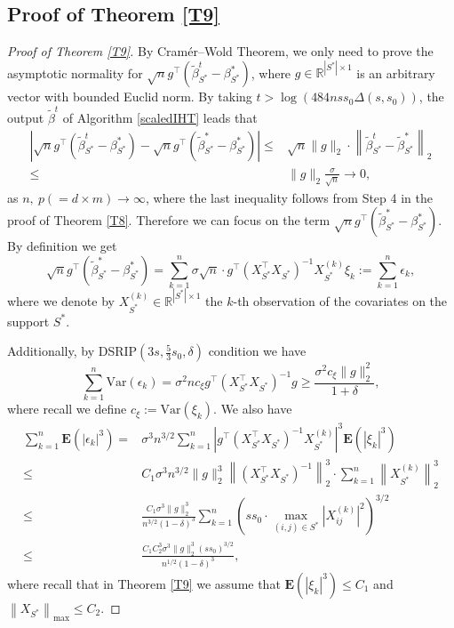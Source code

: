 \documentclass[12pt]{article}
\newtheorem{proof}{Proof}
\begin{document}
\begin{appendix}
\subsection{Proof of Theorem \ref{T9}}
\begin{proof}[Proof of Theorem \ref{T9}]
By Cram\'er--Wold Theorem, we only need to prove the asymptotic normality for $\sqrt n g^\top (\tilde\beta^t_{S^*} - \beta^*_{S^*})$, where $g \in \mathbb R^{|S^*| \times 1}$ is an arbitrary vector with bounded Euclid norm.
By taking  $t >  \log \left(  484 n ss_0 \Delta(s,s_0) \right)$, the output $\tilde\beta^t$ of Algorithm \ref{scaledIHT} leads that
\begin{align*}
    \left|\sqrt n g^\top (\tilde\beta^t_{S^*} - \beta^*_{S^*}) 
-\sqrt n  g^\top (\tilde\beta^*_{S^*} - \beta^*_{S^*}) \right|
\le&\sqrt n \|g\|_2 \cdot  \left\| \tilde\beta^t_{S^*} - \tilde\beta^*_{S^*} \right\|_2\\
\le& \|g\|_2 \frac{\sigma}{\sqrt n}
\to 0, 
\end{align*}
as $n,~ p(=d\times m) \to \infty$, where the last inequality follows from Step 4 in the proof of Theorem \ref{T8}.
Therefore we can focus on the term $\sqrt ng^\top (\tilde\beta^*_{S^*} - \beta^*_{S^*})$. By definition we get 
\begin{equation} 
\sqrt n g^\top (\tilde\beta^*_{S^*} - \beta^*_{S^*})
= \sum_{k=1}^n  \sigma\sqrt n \cdot g^\top (X_{S^*}^\top X_{S^*})^{-1} X_{S^*}^{(k)} \xi_k
:= \sum_{k=1}^n \epsilon_k,
\end{equation}
where we denote by $ X_{S^*}^{(k)} \in \mathbb R^{|S^*| \times 1}$ the $k$-th observation of the covariates on the support $S^*$.

Additionally, by DSRIP$(3s,\frac53 s_0, \delta )$ condition we have 
\begin{equation}
    \sum_{k=1}^n\text{Var} \left (  \epsilon_k \right ) 
    = \sigma^2 nc_\xi g^\top (X_{S^*}^\top X_{S^*})^{-1} g
\ge \frac{\sigma^2 c_\xi \|g\|_2^2}{ 1+\delta },
\end{equation}
where recall we define $c_\xi := \text{Var}(\xi_k)$. 
We also have 
\begin{equation}
\begin{aligned}
 \sum_{k=1}^n \mathbf E\left( |\epsilon_k|^3 \right)
=& \sigma^3 n^{3/2}\sum_{k=1}^n \left| g^\top (X_{S^*}^\top X_{S^*})^{-1} X_{S^*}^{(k)}\right|^3 
   \mathbf E\left( |\xi_k|^3 \right)\\
\le& C_1 \sigma^3 n^{3/2} \| g\|_2^3  \left\| (X_{S^*}^\top X_{S^*})^{-1}\right\|_2^3
   \cdot\sum_{k=1}^n\left\|X_{S^*}^{(k)}\right\|_2^3 \\
\le& \frac{C_1 \sigma^3 \| g\|_2^3 }{n^{3/2} (1-\delta)^3} 
   \sum_{k=1}^n \left( ss_0\cdot\max_{(i,j) \in S^*} \left|X_{ij}^{(k)}\right|^2 \right)^{3/2}\\
\le& \frac{C_1 C_2^3 \sigma^3 \| g\|_2^3 (ss_0)^{3/2} }{n^{1/2} (1-\delta)^3} ,
\end{aligned}
\end{equation}
where recall that in Theorem \ref{T9} we assume that $\mathbf E\left( |\xi_k|^3 \right)\le C_1$ and $\left\|X_{S^*} \right\|_{\max} \le C_2$.


\end{proof}
\end{appendix}
\end{document}
